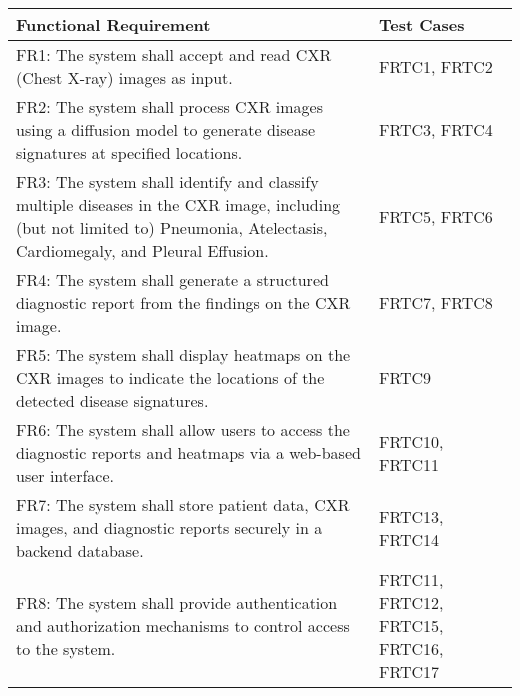 \documentclass[12pt, titlepage]{article}
\begin{document}
\begin{table}[h]
  \centering
  \begin{tabular}{|p{}|p{}|}
    \hline
    \textbf{Functional Requirement} & \textbf{Test Cases} \\
    \hline
    FR1: The system shall accept and read CXR (Chest X-ray) images as input. & FRTC1, FRTC2 \\
    \hline
    FR2: The system shall process CXR images using a diffusion model to generate disease signatures at specified locations. & FRTC3, FRTC4 \\
    \hline
    FR3: The system shall identify and classify multiple diseases in the CXR image, including (but not limited to) Pneumonia, Atelectasis, Cardiomegaly, and Pleural Effusion. & FRTC5, FRTC6 \\
    \hline
    FR4: The system shall generate a structured diagnostic report from the findings on the CXR image. & FRTC7, FRTC8 \\
    \hline
    FR5: The system shall display heatmaps on the CXR images to indicate the locations of the detected disease signatures. & FRTC9 \\
    \hline
    FR6: The system shall allow users to access the diagnostic reports and heatmaps via a web-based user interface. & FRTC10, FRTC11 \\
    \hline
    FR7: The system shall store patient data, CXR images, and diagnostic reports securely in a backend database. & FRTC13, FRTC14 \\
    \hline
    FR8: The system shall provide authentication and authorization mechanisms to control access to the system. & FRTC11, FRTC12, FRTC15, FRTC16, FRTC17 \\
    \hline
  \end{tabular}
\end{table}

\pagebreak
\end{document}
